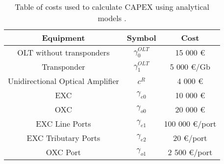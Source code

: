 \begin{table}[h!]
\centering
\begin{tabular}{|| c | c | c ||}
 \hline
 Equipment & Symbol & Cost \\
 \hline\hline
 OLT without transponders & $\gamma_0^{OLT}$ & 15 000 \euro \\
 Transponder & $\gamma_1^{OLT}$ & 5 000 \euro/Gb \\
 Unidirectional Optical Amplifier & $c^R$ & 4 000 \euro \\
 EXC & $\gamma_{e0}$ & 10 000 \euro \\
 OXC & $\gamma_{o0}$ & 20 000 \euro \\
 EXC Line Ports & $\gamma_{e1}$ & 100 000 \euro /port\\
 EXC Tributary Ports & $\gamma_{e2}$ & 20 \euro /port\\
 OXC Port & $\gamma_{o1}$ & 2 500 \euro /port \\
 \hline
\end{tabular}
\caption{Table of costs used to calculate CAPEX using analytical models \cite{aulas}.}
\label{table_cost_analytical}
\end{table}

